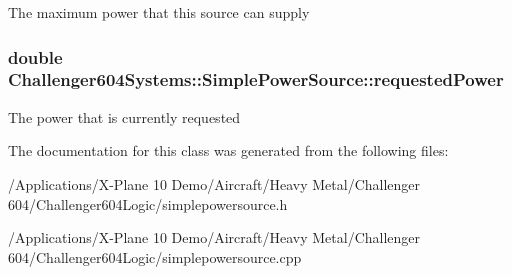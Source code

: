 The maximum power that this source can supply \hypertarget{class_challenger604_systems_1_1_simple_power_source_af9ee729a686825c87e59c55622b64659}{
\subsubsection[{requested\-Power}]{\setlength{\rightskip}{0pt plus 5cm}double Challenger604\-Systems\-::\-Simple\-Power\-Source\-::requested\-Power\hspace{0.3cm}{\ttfamily [protected]}}}\label{class_challenger604_systems_1_1_simple_power_source_af9ee729a686825c87e59c55622b64659}
The power that is currently requested 

The documentation for this class was generated from the following files\-:\begin{DoxyCompactItemize}
\item 
/\-Applications/\-X-\/\-Plane 10 Demo/\-Aircraft/\-Heavy Metal/\-Challenger 604/\-Challenger604\-Logic/simplepowersource.\-h\item 
/\-Applications/\-X-\/\-Plane 10 Demo/\-Aircraft/\-Heavy Metal/\-Challenger 604/\-Challenger604\-Logic/simplepowersource.\-cpp\end{DoxyCompactItemize}
